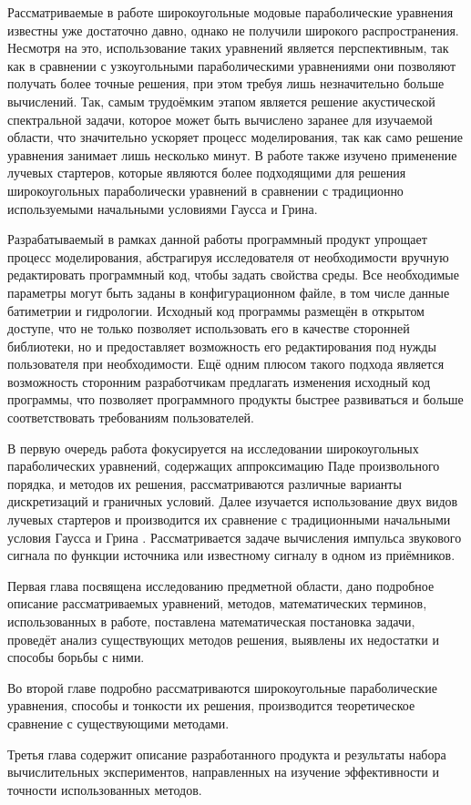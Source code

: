 \documentclass[../document.tex]{subfiles}
\begin{document}
	    \par Рассматриваемые в работе широкоугольные модовые параболические уравнения известны уже достаточно давно, однако не получили широкого распространения. Несмотря на это, использование таких уравнений является перспективным, так как в сравнении с узкоугольными параболическими уравнениями они позволяют получать более точные решения, при этом требуя лишь незначительно больше вычислений. Так, самым трудоёмким этапом является решение акустической спектральной задачи, которое может быть вычислено заранее для изучаемой области, что значительно ускоряет процесс моделирования, так как само решение уравнения занимает лишь несколько минут. В работе также изучено применение лучевых стартеров, которые являются более подходящими для решения широкоугольных параболически уравнений в сравнении с традиционно используемыми начальными условиями Гаусса и Грина.
	    \par Разрабатываемый в рамках данной работы программный продукт упрощает процесс моделирования, абстрагируя исследователя от необходимости вручную редактировать программный код, чтобы задать свойства среды. Все необходимые параметры могут быть заданы в конфигурационном файле, в том числе данные батиметрии и гидрологии. Исходный код программы размещён в открытом доступе, что не только позволяет использовать его в качестве сторонней библиотеки, но и предоставляет возможность его редактирования под нужды пользователя при необходимости. Ещё одним плюсом такого подхода является возможность сторонним разработчикам предлагать изменения исходный код программы, что позволяет программного продукты быстрее развиваться и больше соответствовать требованиям пользователей.
	    \par В первую очередь работа фокусируется на исследовании широкоугольных параболических уравнений, содержащих аппроксимацию Паде произвольного порядка, и методов их решения, рассматриваются различные варианты дискретизаций и граничных условий. Далее изучается использование двух видов лучевых стартеров и производится их сравнение с традиционными начальными условия Гаусса и Грина \cite{jensen}. Рассматривается задаче вычисления импульса звукового сигнала по функции источника или известному сигналу в одном из приёмников.
	    \par Первая глава посвящена исследованию предметной области, дано подробное описание рассматриваемых уравнений, методов, математических терминов, использованных в работе, поставлена математическая постановка задачи, проведёт анализ существующих методов решения, выявлены их недостатки и способы борьбы с ними.
	    \par Во второй главе подробно рассматриваются широкоугольные параболические уравнения, способы и тонкости их решения, производится теоретическое сравнение с существующими методами.
	    \par Третья глава содержит описание разработанного продукта и результаты набора вычислительных экспериментов, направленных на изучение эффективности и точности использованных методов.
\end{document}
